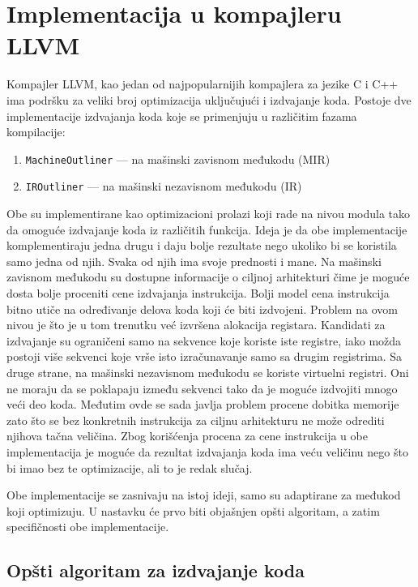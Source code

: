 \documentclass[12pt,oneside]{memoir}
\begin{document}
\section{Implementacija u kompajleru LLVM}

Kompajler LLVM, kao jedan od najpopularnijih kompajlera za jezike C i C++ ima podršku za veliki broj optimizacija uključujući i izdvajanje koda.
Postoje dve implementacije izdvajanja koda koje se primenjuju u različitim fazama kompilacije:
\begin{enumerate}
  \item \verb|MachineOutliner| --- na mašinski zavisnom međukodu (MIR) \cite{paquette2016machineoutliner} %
  \item \verb|IROutliner| --- na mašinski nezavisnom međukodu (IR) \cite{litteken2020iroutliner} %
\end{enumerate}
Obe su implementirane kao optimizacioni prolazi koji rade na nivou modula tako da omoguće izdvajanje koda iz različitih funkcija.
Ideja je da obe implementacije komplementiraju jedna drugu i daju bolje rezultate nego ukoliko bi se koristila samo jedna od njih.
Svaka od njih ima svoje prednosti i mane.
Na mašinski zavisnom međukodu su dostupne informacije o ciljnoj arhitekturi čime je moguće dosta bolje proceniti cene izdvajanja instrukcija.
Bolji model cena instrukcija bitno utiče na određivanje delova koda koji će biti izdvojeni.
Problem na ovom nivou je što je u tom trenutku već izvršena alokacija registara.
Kandidati za izdvajanje su ograničeni samo na sekvence koje koriste iste registre, iako možda postoji više sekvenci koje vrše isto izračunavanje samo sa drugim registrima.
Sa druge strane, na mašinski nezavisnom međukodu se koriste virtuelni registri.
Oni ne moraju da se poklapaju između sekvenci tako da je moguće izdvojiti mnogo veći deo koda.
Međutim ovde se sada javlja problem procene dobitka memorije zato što se bez konkretnih instrukcija za ciljnu arhitekturu ne može odrediti njihova tačna veličina.
Zbog korišćenja procena za cene instrukcija u obe implementacija je moguće da rezultat izdvajanja koda ima veću veličinu nego što bi imao bez te optimizacije, ali to je redak slučaj.

Obe implementacije se zasnivaju na istoj ideji, samo su adaptirane za međukod koji optimizuju.
U nastavku će prvo biti objašnjen opšti algoritam, a zatim specifičnosti obe implementacije.

\subsection{Opšti algoritam za izdvajanje koda}
\end{document}
